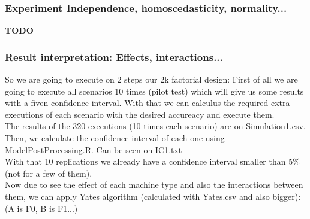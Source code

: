 \documentclass[12pt]{article}
\begin{document}
\subsubsection{Experiment Independence, homoscedasticity, normality...}
\textbf{TODO}
\subsubsection{Result interpretation: Effects, interactions...}
So we are going to execute on 2 steps our 2k factorial design: First of all we are going to execute all scenarios 10 times (pilot test) which will give us some results with a fiven confidence interval. With that we can calculus the required extra executions of each scenario with the desired accureacy and execute them.\\
The results of the 320 executions (10 times each scenario) are on Simulation1.csv.
Then, we calculate the confidence interval of each one using ModelPostProcessing.R. Can be seen on IC1.txt\\
With that 10 replications we already have a confidence interval smaller than 5\% (not for a few of them).\\

Now due to see the effect of each machine type and also the interactions between them, we can apply Yates algorithm (calculated with Yates.csv and also bigger):
(A is F0, B is F1...)
\end{document}
